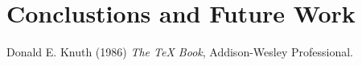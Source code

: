 \documentclass[10pt,a4paper]{report}
\begin{document}
\newpage
\chapter{Conclustions and Future Work}





\newpage
\begin{thebibliography}{999}
    Donald E. Knuth (1986) \emph{The \TeX{} Book}, Addison-Wesley Professional.
\end{thebibliography}
\end{document}
